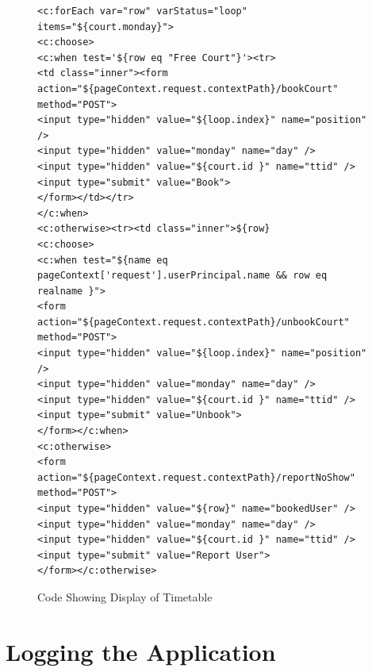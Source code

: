 \begin{figure}[H]
\begin{lstlisting}
<c:forEach var="row" varStatus="loop" items="${court.monday}">
<c:choose>
<c:when test='${row eq "Free Court"}'><tr>
<td class="inner"><form action="${pageContext.request.contextPath}/bookCourt"
method="POST">
<input type="hidden" value="${loop.index}" name="position" />
<input type="hidden" value="monday" name="day" /> 
<input type="hidden" value="${court.id }" name="ttid" />
<input type="submit" value="Book">
</form></td></tr>
</c:when>
<c:otherwise><tr><td class="inner">${row}
<c:choose>
<c:when test="${name eq pageContext['request'].userPrincipal.name && row eq realname }">
<form action="${pageContext.request.contextPath}/unbookCourt" method="POST">
<input type="hidden" value="${loop.index}" name="position" />
<input type="hidden" value="monday" name="day" /> 
<input type="hidden" value="${court.id }" name="ttid" /> 
<input type="submit" value="Unbook">
</form></c:when>
<c:otherwise>
<form action="${pageContext.request.contextPath}/reportNoShow" method="POST">
<input type="hidden" value="${row}" name="bookedUser" />
<input type="hidden" value="monday" name="day" /> 
<input type="hidden" value="${court.id }" name="ttid" /> 
<input type="submit" value="Report User">
</form></c:otherwise>
\end{lstlisting}
\caption{Code Showing Display of Timetable}
\end{figure}


\section{Logging the Application}

